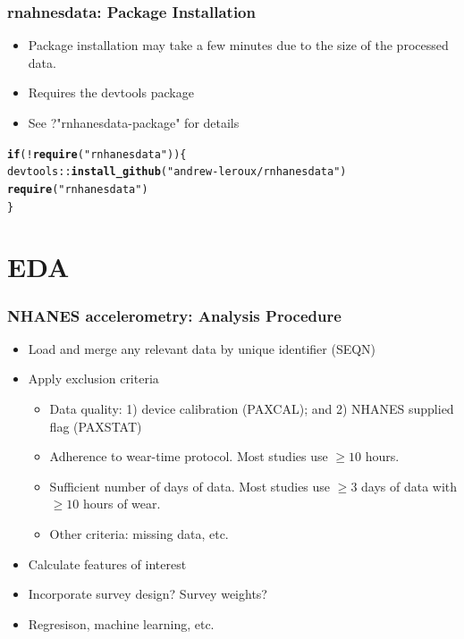 \documentclass[10pt]{beamer}\usepackage[]{graphicx}\usepackage[]{color}
\makeatletter
\newcommand{\hlstr}[1]{\textcolor[rgb]{0.192,0.494,0.8}{#1}}%
\newcommand{\hlopt}[1]{\textcolor[rgb]{0,0,0}{#1}}%
\newcommand{\hlstd}[1]{\textcolor[rgb]{0.345,0.345,0.345}{#1}}%
\newcommand{\hlkwa}[1]{\textcolor[rgb]{0.161,0.373,0.58}{\textbf{#1}}}%
\newcommand{\hlkwd}[1]{\textcolor[rgb]{0.737,0.353,0.396}{\textbf{#1}}}%
\newenvironment{kframe}{%
 \def\at@end@of@kframe{}%
 \ifinner\ifhmode%
  \def\at@end@of@kframe{\end{minipage}}%
  \begin{minipage}{\columnwidth}%
 \fi\fi%
 \def\FrameCommand##1{\hskip\@totalleftmargin \hskip-\fboxsep
 \colorbox{shadecolor}{##1}\hskip-\fboxsep
     \hskip-\linewidth \hskip-\@totalleftmargin \hskip\columnwidth}%
 \MakeFramed {\advance\hsize-\width
   \@totalleftmargin\z@ \linewidth\hsize
   \@setminipage}}%
 {\par\unskip\endMakeFramed%
 \at@end@of@kframe}
\newenvironment{knitrout}{}{} %
\makeatother
\begin{document}
\begin{frame}[fragile]
\frametitle{rnahnesdata: Package Installation}

\begin{itemize}
\item Package installation may take a few minutes due to the size of the processed data.
\item Requires the devtools package 
\item See ?"rnhanesdata-package" for details
\end{itemize}

\begin{knitrout}\small
{}\color{fgcolor}\begin{kframe}
\begin{alltt}
\hlkwa{if}\hlstd{(}\hlopt{!}\hlkwd{require}\hlstd{(}\hlstr{"rnhanesdata"}\hlstd{))\{}
    \hlstd{devtools}\hlopt{::}\hlkwd{install_github}\hlstd{(}\hlstr{"andrew-leroux/rnhanesdata"}\hlstd{)}
    \hlkwd{require}\hlstd{(}\hlstr{"rnhanesdata"}\hlstd{)}
\hlstd{\}}
\end{alltt}
\end{kframe}
\end{knitrout}
\end{frame}



\section{EDA}




\begin{frame}
\frametitle{NHANES accelerometry: Analysis Procedure}
\begin{itemize}
\item Load and merge any relevant data by unique identifier (SEQN)
\item Apply exclusion criteria
    \begin{itemize}
    \item Data quality: 1) device calibration (PAXCAL); and 2) NHANES supplied flag (PAXSTAT)
    \item Adherence to wear-time protocol. Most studies use $\geq 10$ hours.
    \item Sufficient number of days of data. Most studies use $ \geq 3$ days of data with $\geq 10$ hours of wear.
    \item Other criteria: missing data, etc.
    \end{itemize}   
\item Calculate features of interest
\item Incorporate survey design? Survey weights?
\item Regresison, machine learning, etc.
\end{itemize}
\end{frame}
\end{document}
